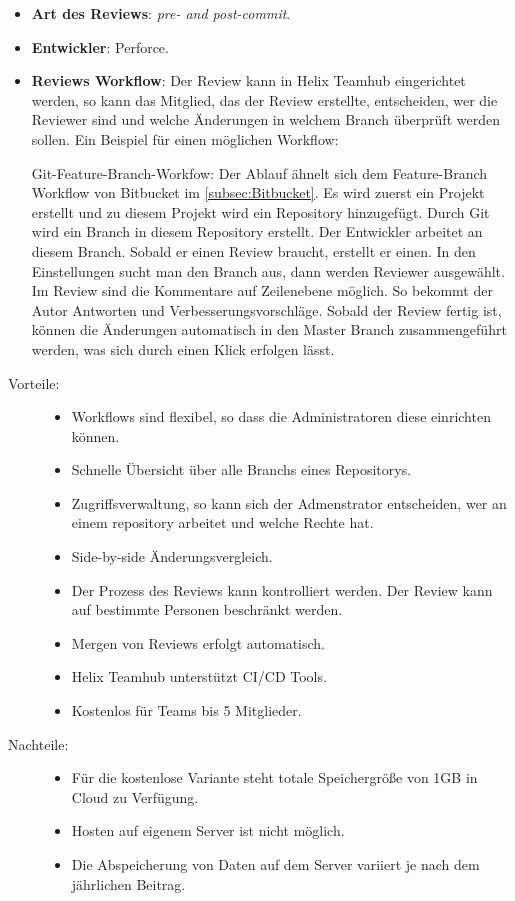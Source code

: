 \begin{itemize}
	\item \textbf{Art des Reviews}: \textit{pre- and post-commit}.
	\item \textbf{Entwickler}: Perforce. 
	\item \textbf{Reviews Workflow}: Der Review kann in Helix Teamhub eingerichtet werden, so kann das Mitglied, das der Review erstellte, entscheiden, wer die Reviewer
		 sind und welche Änderungen in welchem Branch überprüft werden sollen.
		 Ein Beispiel für einen möglichen Workflow:
		 
		  Git-Feature-Branch-Workfow: Der Ablauf ähnelt sich dem Feature-Branch Workflow von Bitbucket im \cref{subsec:Bitbucket}.
		  Es wird zuerst ein Projekt erstellt und zu diesem Projekt wird ein Repository hinzugefügt. Durch Git wird ein Branch in diesem Repository
		  erstellt. Der Entwickler arbeitet an diesem Branch. Sobald er einen Review braucht, erstellt er einen. In den Einstellungen sucht man den Branch aus, dann werden Reviewer
		  ausgewählt. Im Review sind die Kommentare auf Zeilenebene möglich. So bekommt der Autor Antworten und Verbesserungsvorschläge. Sobald der Review fertig ist,
		  können die Änderungen automatisch in den Master Branch zusammengeführt werden, was sich durch einen Klick erfolgen lässt.
\end{itemize}

\begin{description}
	\item [Vorteile:] \hfill
	\begin{itemize}
		\item Workflows sind flexibel, so dass die Administratoren diese einrichten können.
		\item Schnelle Übersicht über alle Branchs eines Repositorys.
		\item Zugriffsverwaltung, so kann sich der Admenstrator entscheiden, wer an einem repository arbeitet und welche Rechte hat.
		\item Side-by-side Änderungsvergleich.
		\item Der Prozess des Reviews kann kontrolliert werden. Der Review kann auf bestimmte Personen beschränkt werden.
		\item Mergen von Reviews erfolgt automatisch.
		\item Helix Teamhub unterstützt \ac{CI}/\ac{CD} Tools.
		\item Kostenlos für Teams bis 5 Mitglieder.
	\end{itemize}
	
	\item [Nachteile:] \hfill
	\begin{itemize}
	\item Für die kostenlose Variante steht totale Speichergröße von 1GB in Cloud zu Verfügung.
	\item Hosten auf eigenem Server ist nicht möglich.
	\item Die Abspeicherung von Daten auf dem Server variiert je nach dem jährlichen Beitrag.
	\end{itemize}
\end{description}


